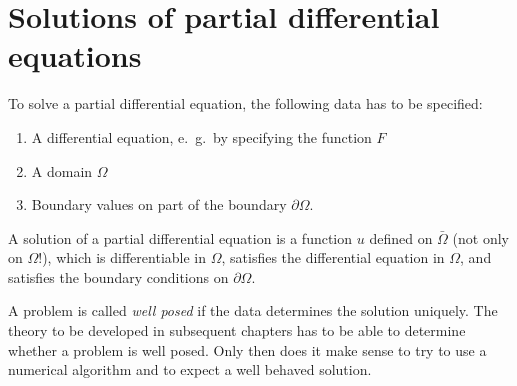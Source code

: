 %
%
%
\section{Solutions of partial differential equations\label{klassifikation:loesung}}
To solve a partial differential equation, the following data has to be
specified:
\begin{enumerate}
\item
A differential equation, e.~g.~by specifying the function $F$
\item
A domain $\Omega$
\item
Boundary values on part of the boundary $\partial\Omega$.
\end{enumerate}
\begin{definition}
A solution of a partial differential equation is a function $u$
defined on $\bar \Omega$ (not only on $\Omega$!), which is
differentiable in $\Omega$, satisfies the differential equation in
$\Omega$, and satisfies the boundary conditions on $\partial\Omega$.
\end{definition}

A problem is called {\em well posed} if the data determines the solution
uniquely.
The theory to be developed in subsequent chapters has to be able to
determine whether a problem is well posed.
Only then does it make sense to try to use a numerical algorithm
and to expect a well behaved solution.

%
%
